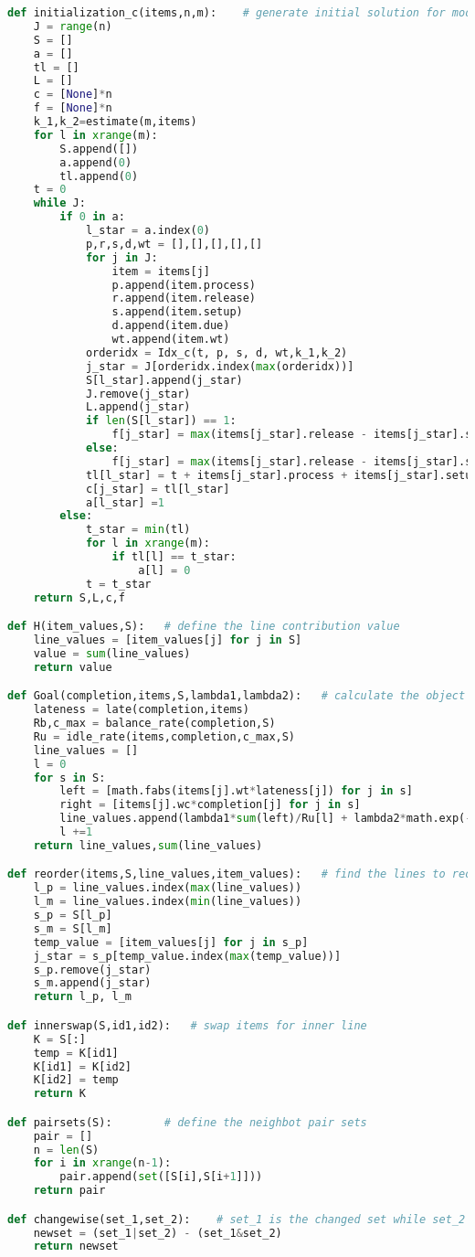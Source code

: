 \begin{lstlisting}[language = Python]
def initialization_c(items,n,m):	# generate initial solution for model 2
	J = range(n)
	S = []
	a = []
	tl = []
	L = []
	c = [None]*n
	f = [None]*n	
	k_1,k_2=estimate(m,items)
	for l in xrange(m):
		S.append([])
		a.append(0)
		tl.append(0)
	t = 0
	while J:
		if 0 in a:
			l_star = a.index(0)
			p,r,s,d,wt = [],[],[],[],[]
			for j in J:
				item = items[j]
				p.append(item.process)
				r.append(item.release)
				s.append(item.setup)
				d.append(item.due)
				wt.append(item.wt)
			orderidx = Idx_c(t, p, s, d, wt,k_1,k_2)
			j_star = J[orderidx.index(max(orderidx))]
			S[l_star].append(j_star)
			J.remove(j_star)
			L.append(j_star)
			if len(S[l_star]) == 1:
				f[j_star] = max(items[j_star].release - items[j_star].setup,0)
			else:
				f[j_star] = max(items[j_star].release - items[j_star].setup - c[S[l_star][S[l_star].index(j_star) -1]],0)
			tl[l_star] = t + items[j_star].process + items[j_star].setup + f[j_star]
			c[j_star] = tl[l_star]
			a[l_star] =1
		else:
			t_star = min(tl)
			for l in xrange(m):
				if tl[l] == t_star:
					a[l] = 0
			t = t_star
	return S,L,c,f

def H(item_values,S):	# define the line contribution value
	line_values = [item_values[j] for j in S]
	value = sum(line_values)
	return value

def Goal(completion,items,S,lambda1,lambda2):	# calculate the object function value
	lateness = late(completion,items)
	Rb,c_max = balance_rate(completion,S)
	Ru = idle_rate(items,completion,c_max,S)
	line_values = []
	l = 0
	for s in S:
		left = [math.fabs(items[j].wt*lateness[j]) for j in s]
		right = [items[j].wc*completion[j] for j in s]
		line_values.append(lambda1*sum(left)/Ru[l] + lambda2*math.exp(-Rb)*sum(right))
		l +=1
	return line_values,sum(line_values)

def reorder(items,S,line_values,item_values):	# find the lines to reorder its items
	l_p = line_values.index(max(line_values))
	l_m = line_values.index(min(line_values))
	s_p = S[l_p]
	s_m = S[l_m]
	temp_value = [item_values[j] for j in s_p]
	j_star = s_p[temp_value.index(max(temp_value))]
	s_p.remove(j_star)
	s_m.append(j_star)
	return l_p, l_m

def innerswap(S,id1,id2):	# swap items for inner line
	K = S[:]
	temp = K[id1]
	K[id1] = K[id2]
	K[id2] = temp
	return K

def pairsets(S):		# define the neighbot pair sets
	pair = []
	n = len(S)
	for i in xrange(n-1):
		pair.append(set([S[i],S[i+1]]))
	return pair

def changewise(set_1,set_2):	# set_1 is the changed set while set_2 is not
	newset = (set_1|set_2) - (set_1&set_2)
	return newset


\end{lstlisting}
